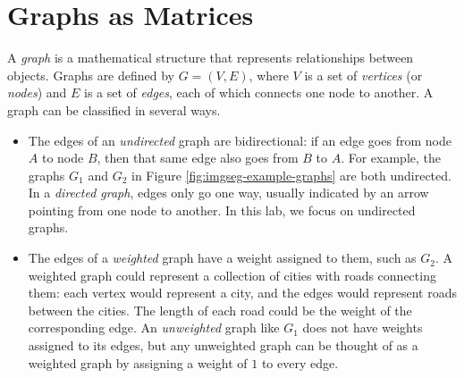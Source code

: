 

\section*{Graphs as Matrices} %

A \emph{graph} is a mathematical structure that represents relationships between objects.
Graphs are defined by $G = (V,E)$, where $V$ is a set of \emph{vertices} (or \emph{nodes}) and $E$ is a set of \emph{edges}, each of which connects one node to another.
A graph can be classified in several ways.
\begin{itemize}
    \item The edges of an \emph{undirected} graph are bidirectional: if an edge goes from node $A$ to node $B$, then that same edge also goes from $B$ to $A$.
    For example, the graphs $G_1$ and $G_2$ in Figure \ref{fig:imgseg-example-graphs} are both undirected.
    In a \emph{directed graph}, edges only go one way, usually indicated by an arrow pointing from one node to another.
    In this lab, we focus on undirected graphs.

    \item The edges of a \emph{weighted} graph have a weight assigned to them, such as $G_2$.
    A weighted graph could represent a collection of cities with roads connecting them: each vertex would represent a city, and the edges would represent roads between the cities.
    The length of each road could be the weight of the corresponding edge.
    An \emph{unweighted} graph like $G_1$ does not have weights assigned to its edges, but any unweighted graph can be thought of as a weighted graph by assigning a weight of $1$ to every edge.

\end{itemize}


